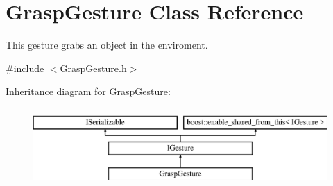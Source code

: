 \hypertarget{class_grasp_gesture}{}\section{Grasp\+Gesture Class Reference}
\label{class_grasp_gesture}


This gesture grabs an object in the enviroment.  




{\ttfamily \#include $<$Grasp\+Gesture.\+h$>$}

Inheritance diagram for Grasp\+Gesture\+:\begin{figure}[H]
\begin{center}
\leavevmode
\includegraphics[height=3.000000cm]{class_grasp_gesture}
\end{center}
\end{figure}
